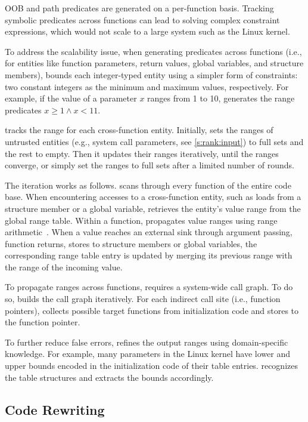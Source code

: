 OOB and path predicates are generated on a per-function basis.
Tracking symbolic predicates across functions can lead to solving complex
constraint expressions, which would not scale to a large system such as the
Linux kernel.

To address the scalability issue, when generating predicates across functions
(i.e., for entities like function parameters, return values, global variables,
and structure members), \sys bounds each integer-typed entity using a simpler
form of constraints: two constant
integers as the minimum and maximum values, respectively. For example, if the
value of a parameter $x$ ranges from 1 to 10, \sys generates the range
predicates $x \geq 1 \land x < 11$.

\sys tracks the range for each cross-function entity. Initially,
\sys sets the ranges of untrusted entities (e.g., system call
parameters, see \autoref{s:rank:input}) to full sets and the rest
to empty.  Then it updates their ranges iteratively, until the
ranges converge, or simply set the ranges to full sets after a limited
number of rounds.

The iteration works as follows.
\sys scans through every function of the entire code base. When encountering
accesses to a cross-function entity, such as loads from a structure member or a
global variable, \sys retrieves the entity's value range from the global range
table.  Within a function, \sys propagates value ranges using range
arithmetic~\cite{range-analysis}.  When a value reaches an external sink
through argument passing, function returns, stores to structure members or
global variables, the corresponding range table entry is updated by merging its
previous range with the range of the incoming value.

To propagate ranges across functions, \sys requires a system-wide
call graph.  To do so, \sys builds the call graph iteratively. For
each indirect call site (i.e., function pointers), \sys collects
possible target functions from initialization code and stores to
the function pointer.

To further reduce false errors, \sys refines the output ranges using
domain-specific knowledge. For example, many  parameters in the
Linux kernel have lower and upper bounds encoded in the initialization code of
their  table entries.  \sys recognizes the  table
structures and extracts the bounds accordingly.


\subsection{Code Rewriting}
\label{s:gen:opt}

